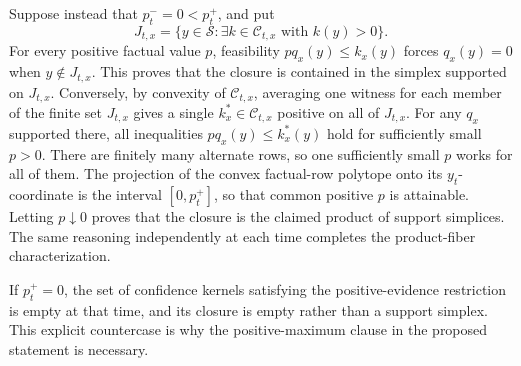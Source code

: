 Suppose instead that \(p_t^-=0<p_t^+\), and put
\[
 J_{t,x}=\{y\in\mathcal S:\exists k\in\mathcal C_{t,x}
                    \text{ with }k(y)>0\}.
\]
For every positive factual value \(p\), feasibility \(pq_x(y)\le k_x(y)\) forces \(q_x(y)=0\) when \(y\notin J_{t,x}\).  This proves that the closure is contained in the simplex supported on \(J_{t,x}\).  Conversely, by convexity of \(\mathcal C_{t,x}\), averaging one witness for each member of the finite set \(J_{t,x}\) gives a single \(k_x^*\in\mathcal C_{t,x}\) positive on all of \(J_{t,x}\).  For any \(q_x\) supported there, all inequalities \(pq_x(y)\le k_x^*(y)\) hold for sufficiently small \(p>0\).  There are finitely many alternate rows, so one sufficiently small \(p\) works for all of them.  The projection of the convex factual-row polytope onto its \(y_t\)-coordinate is the interval \([0,p_t^+]\), so that common positive \(p\) is attainable.  Letting \(p\downarrow0\) proves that the closure is the claimed product of support simplices.  The same reasoning independently at each time completes the product-fiber characterization.

If \(p_t^+=0\), the set of confidence kernels satisfying the positive-evidence restriction is empty at that time, and its closure is empty rather than a support simplex.  This explicit countercase is why the positive-maximum clause in the proposed statement is necessary.